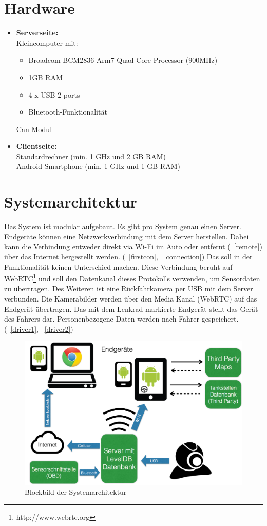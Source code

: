 \documentclass[pflichtenheft.tex]{subfiles}
\begin{document}
\section{Hardware}
\begin{itemize}
\item
\textbf{Serverseite:}\\
Kleincomputer mit:
\begin{itemize}
\item
Broadcom BCM2836 Arm7 Quad Core Processor (900MHz)
\item
1GB RAM
\item
4 x USB 2 ports
\item
Bluetooth-Funktionalität
\end{itemize}
Can-Modul
\item
\textbf{Clientseite:}\\
Standardrechner (min. 1 GHz und 2 GB RAM)\\
Android Smartphone (min. 1 GHz und 1 GB RAM)
\end{itemize}


\newpage
\section{Systemarchitektur}

Das System ist modular aufgebaut. Es gibt pro System genau einen Server. Endgeräte können eine Netzwerkverbindung mit dem Server herstellen. Dabei kann die Verbindung entweder direkt via Wi-Fi im Auto oder entfernt (~\ref{remote}) über das Internet hergestellt werden. (~\ref{firstcon}, ~\ref{connection}) Das soll in der Funktionalität keinen Unterschied machen. Diese Verbindung beruht auf WebRTC\footnote{http://www.webrtc.org} und soll den Datenkanal dieses Protokolls verwenden, um Sensordaten zu übertragen. Des Weiteren ist eine Rückfahrkamera per USB mit dem Server verbunden. Die Kamerabilder werden über den Media Kanal (WebRTC) auf das Endgerät übertragen. Das mit dem Lenkrad markierte Endgerät stellt das Gerät des Fahrers dar. Personenbezogene Daten werden nach Fahrer gespeichert. (~\ref{driver1}, ~\ref{driver2})

\begin{figure}[H]
  	\begin{center}
 		\includegraphics[width=\textwidth]{Images/sysarch.png}
  		\caption{Blockbild der Systemarchitektur}
  	\end{center}
\end{figure}
\end{document}
